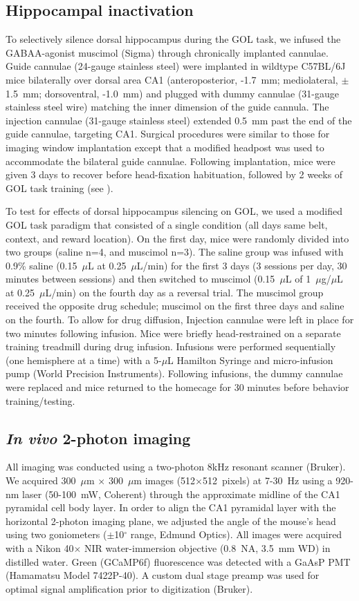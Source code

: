 \subsection{Hippocampal inactivation}
To selectively silence dorsal hippocampus during the GOL task, we infused the GABAA-agonist muscimol (Sigma) through chronically implanted cannulae. Guide cannulae (24-gauge stainless steel) were implanted in wildtype C57BL/6J mice bilaterally over dorsal area CA1 (anteroposterior, -1.7~mm; mediolateral, $\pm$1.5~mm; dorsoventral, -1.0~mm) and plugged with dummy cannulae (31-gauge stainless steel wire) matching the inner dimension of the guide cannula. The injection cannulae (31-gauge stainless steel) extended 0.5~mm past the end of the guide cannulae, targeting CA1. Surgical procedures were similar to those for imaging window implantation except that a modified headpost was used to accommodate the bilateral guide cannulae. Following implantation, mice were given 3 days to recover before head-fixation habituation, followed by 2 weeks of GOL task training (see ).

To test for effects of dorsal hippocampus silencing on GOL, we used a modified GOL task paradigm that consisted of a single condition (all days same belt, context, and reward location). On the first day, mice were randomly divided into two groups (saline n=4, and muscimol n=3). The saline group was infused with 0.9\% saline (0.15~$\mu$L at 0.25~$\mu$L/min) for the first 3 days (3 sessions per day, 30 minutes between sessions) and then switched to muscimol (0.15~$\mu$L of 1~$\mu$g/$\mu$L at 0.25~$\mu$L/min) on the fourth day as a reversal trial. The muscimol group received the opposite drug schedule; muscimol on the first three days and saline on the fourth. To allow for drug diffusion, Injection cannulae were left in place for two minutes following infusion. Mice were briefly head-restrained on a separate training treadmill during drug infusion. Infusions were performed sequentially (one hemisphere at a time) with a 5-$\mu$L Hamilton Syringe and micro-infusion pump (World Precision Instruments). Following infusions, the dummy cannulae were replaced and mice returned to the homecage for 30 minutes before behavior training/testing.

\subsection{\emph{In vivo} 2-photon imaging}
All imaging was conducted using a two-photon 8kHz resonant scanner (Bruker). We acquired 300~$\mu$m $\times$ 300~$\mu$m images (512$\times$512~pixels) at 7-30~Hz using a 920-nm laser (50-100~mW, Coherent) through the approximate midline of the CA1 pyramidal cell body layer. In order to align the CA1 pyramidal layer with the horizontal 2-photon imaging plane, we adjusted the angle of the mouse's head using two goniometers ($\pm$10$^{\circ}$ range, Edmund Optics).  All images were acquired with a Nikon 40$\times$ NIR water-immersion objective (0.8~NA, 3.5~mm WD) in distilled water. Green (GCaMP6f) fluorescence was detected with a GaAsP PMT (Hamamatsu Model 7422P-40). A custom dual stage preamp was used for optimal signal amplification prior to digitization (Bruker). 

